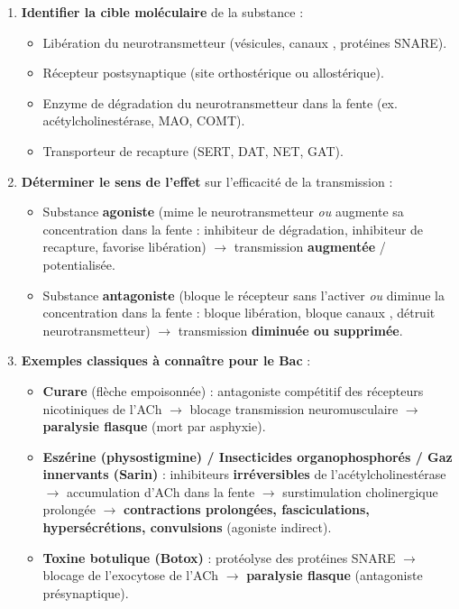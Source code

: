 \documentclass[11pt]{article}
\begin{document}
\begin{methode}
\begin{enumerate}
\item \textbf{Identifier la cible moléculaire} de la substance :
\begin{itemize}
\item Libération du neurotransmetteur (vésicules, canaux , protéines SNARE).
\item Récepteur postsynaptique (site orthostérique ou allostérique).
\item Enzyme de dégradation du neurotransmetteur dans la fente (ex. acétylcholinestérase, MAO, COMT).
\item Transporteur de recapture (SERT, DAT, NET, GAT).
\end{itemize}
\item \textbf{Déterminer le sens de l'effet} sur l'efficacité de la transmission :
\begin{itemize}
\item Substance \textbf{agoniste} (mime le neurotransmetteur \emph{ou} augmente sa concentration dans la fente : inhibiteur de dégradation, inhibiteur de recapture, favorise libération) $\rightarrow$ transmission \textbf{augmentée} / potentialisée.
\item Substance \textbf{antagoniste} (bloque le récepteur sans l'activer \emph{ou} diminue la concentration dans la fente : bloque libération, bloque canaux , détruit neurotransmetteur) $\rightarrow$ transmission \textbf{diminuée ou supprimée}.
\end{itemize}
\item \textbf{Exemples classiques à connaître pour le Bac} :
\begin{itemize}
\item \textbf{Curare} (flèche empoisonnée) : antagoniste compétitif des récepteurs nicotiniques de l'ACh $\rightarrow$ blocage transmission neuromusculaire $\rightarrow$ \textbf{paralysie flasque} (mort par asphyxie).
\item \textbf{Eszérine (physostigmine) / Insecticides organophosphorés / Gaz innervants (Sarin)} : inhibiteurs \textbf{irréversibles} de l'acétylcholinestérase $\rightarrow$ accumulation d'ACh dans la fente $\rightarrow$ surstimulation cholinergique prolongée $\rightarrow$ \textbf{contractions prolongées, fasciculations, hypersécrétions, convulsions} (agoniste indirect).
\item \textbf{Toxine botulique (Botox)} : protéolyse des protéines SNARE $\rightarrow$ blocage de l'exocytose de l'ACh $\rightarrow$ \textbf{paralysie flasque} (antagoniste présynaptique).

\end{itemize}
\end{enumerate}
\end{methode}
\end{document}
